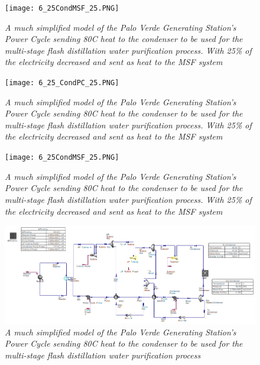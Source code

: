 \documentclass[12pt]{UIdahoMastersThesis}
\begin{document}
\begin{figure}
\texttt{[image: 6\_25CondMSF\_25.PNG]}
\caption{\small \sl A much simplified model of the Palo Verde Generating Station's Power Cycle sending 80\degree C heat to the condenser to be used for the multi-stage flash distillation water purification process. With 25\% of the electricity decreased and sent as heat to the MSF system}
\end{figure}
\begin{figure}
\texttt{[image: 6\_25\_CondPC\_25.PNG]}
\caption{\small \sl A much simplified model of the Palo Verde Generating Station's Power Cycle sending 80\degree C heat to the condenser to be used for the multi-stage flash distillation water purification process. With 25\% of the electricity decreased and sent as heat to the MSF system}
\end{figure}
\begin{figure}
\texttt{[image: 6\_25CondMSF\_25.PNG]}
\caption{\small \sl A much simplified model of the Palo Verde Generating Station's Power Cycle sending 80\degree C heat to the condenser to be used for the multi-stage flash distillation water purification process. With 25\% of the electricity decreased and sent as heat to the MSF system}
\end{figure}
\begin{figure}
\includegraphics[width=\textwidth]{80PC.PNG}
\caption{\small \sl A much simplified model of the Palo Verde Generating Station's Power Cycle sending 80\degree C heat to the condenser to be used for the multi-stage flash distillation water purification process}
\end{figure}
\end{document}
